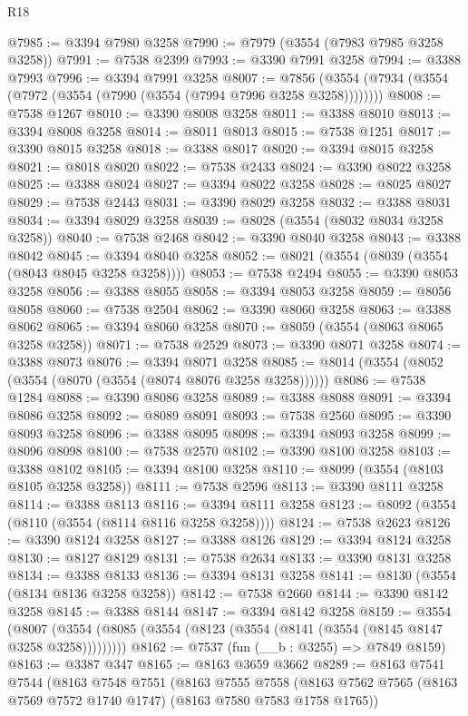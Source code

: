 \begin{lexlean}{R18}
\begin{coremodule}
@7985 := @3394 @7980 @3258
@7990 := @7979 (@3554 (@7983 @7985 @3258 @3258))
@7991 := @7538 @2399
@7993 := @3390 @7991 @3258
@7994 := @3388 @7993
@7996 := @3394 @7991 @3258
@8007 := @7856 (@3554 (@7934 (@3554 (@7972 (@3554 (@7990 (@3554 (@7994 @7996 @3258 @3258))))))))
@8008 := @7538 @1267
@8010 := @3390 @8008 @3258
@8011 := @3388 @8010
@8013 := @3394 @8008 @3258
@8014 := @8011 @8013
@8015 := @7538 @1251
@8017 := @3390 @8015 @3258
@8018 := @3388 @8017
@8020 := @3394 @8015 @3258
@8021 := @8018 @8020
@8022 := @7538 @2433
@8024 := @3390 @8022 @3258
@8025 := @3388 @8024
@8027 := @3394 @8022 @3258
@8028 := @8025 @8027
@8029 := @7538 @2443
@8031 := @3390 @8029 @3258
@8032 := @3388 @8031
@8034 := @3394 @8029 @3258
@8039 := @8028 (@3554 (@8032 @8034 @3258 @3258))
@8040 := @7538 @2468
@8042 := @3390 @8040 @3258
@8043 := @3388 @8042
@8045 := @3394 @8040 @3258
@8052 := @8021 (@3554 (@8039 (@3554 (@8043 @8045 @3258 @3258))))
@8053 := @7538 @2494
@8055 := @3390 @8053 @3258
@8056 := @3388 @8055
@8058 := @3394 @8053 @3258
@8059 := @8056 @8058
@8060 := @7538 @2504
@8062 := @3390 @8060 @3258
@8063 := @3388 @8062
@8065 := @3394 @8060 @3258
@8070 := @8059 (@3554 (@8063 @8065 @3258 @3258))
@8071 := @7538 @2529
@8073 := @3390 @8071 @3258
@8074 := @3388 @8073
@8076 := @3394 @8071 @3258
@8085 := @8014 (@3554 (@8052 (@3554 (@8070 (@3554 (@8074 @8076 @3258 @3258))))))
@8086 := @7538 @1284
@8088 := @3390 @8086 @3258
@8089 := @3388 @8088
@8091 := @3394 @8086 @3258
@8092 := @8089 @8091
@8093 := @7538 @2560
@8095 := @3390 @8093 @3258
@8096 := @3388 @8095
@8098 := @3394 @8093 @3258
@8099 := @8096 @8098
@8100 := @7538 @2570
@8102 := @3390 @8100 @3258
@8103 := @3388 @8102
@8105 := @3394 @8100 @3258
@8110 := @8099 (@3554 (@8103 @8105 @3258 @3258))
@8111 := @7538 @2596
@8113 := @3390 @8111 @3258
@8114 := @3388 @8113
@8116 := @3394 @8111 @3258
@8123 := @8092 (@3554 (@8110 (@3554 (@8114 @8116 @3258 @3258))))
@8124 := @7538 @2623
@8126 := @3390 @8124 @3258
@8127 := @3388 @8126
@8129 := @3394 @8124 @3258
@8130 := @8127 @8129
@8131 := @7538 @2634
@8133 := @3390 @8131 @3258
@8134 := @3388 @8133
@8136 := @3394 @8131 @3258
@8141 := @8130 (@3554 (@8134 @8136 @3258 @3258))
@8142 := @7538 @2660
@8144 := @3390 @8142 @3258
@8145 := @3388 @8144
@8147 := @3394 @8142 @3258
@8159 := @3554
    (@8007 (@3554 (@8085 (@3554 (@8123 (@3554 (@8141 (@3554 (@8145 @8147 @3258 @3258)))))))))
@8162 := @7537 (fun (__b : @3255) => @7849 @8159)
@8163 := @3387 @347
@8165 := @8163 @3659 @3662
@8289 := @8163
    @7541
    @7544
    (@8163
      @7548
      @7551
      (@8163
        @7555
        @7558
        (@8163 @7562 @7565 (@8163 @7569 @7572 @1740 @1747) (@8163 @7580 @7583 @1758 @1765))

\end{coremodule}
\end{lexlean}
